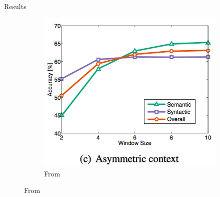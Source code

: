 \begin{frame}{Results}
\begin{figure}
\begin{figure}
      \includegraphics[scale=0.27]{images/analogy3.png}
      \caption{From}
    \end{figure}
  \end{figure}
\end{frame}
